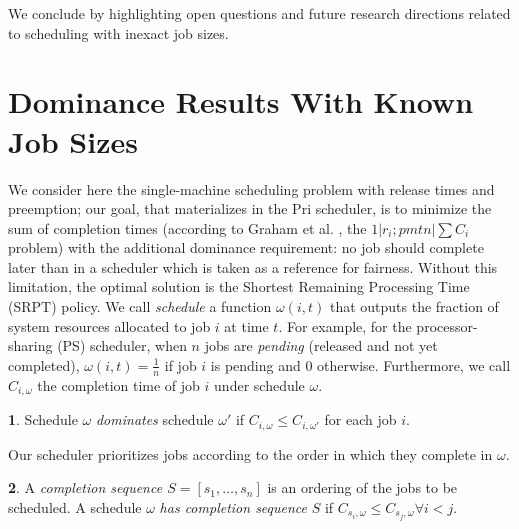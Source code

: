 \documentclass[11pt,oneside,english]{amsart}
\numberwithin{equation}{section}
\numberwithin{figure}{section}
\theoremstyle{definition}
\newtheorem{defn}{\protect\definitionname}
\theoremstyle{plain}
\providecommand{\definitionname}{Definition}
\begin{document}
We conclude by highlighting open questions and future research directions 
related to scheduling with inexact job sizes.



\section{\label{sec:Analytical-Results}Dominance Results With Known Job Sizes}

We consider here the single-machine scheduling problem with release
times and preemption; our goal, that materializes in the $\mathrm{Pri
}$ scheduler, is to minimize the sum of 
completion times (according to Graham et al. \cite{
Graham1979}, the $1|r_{i};pmtn|\sum C_{i}$ problem) with the 
additional dominance requirement: no job should complete later than 
in a scheduler which is taken as a reference for fairness. Without 
this limitation, the optimal solution is the Shortest Remaining 
Processing Time (SRPT) policy. We call \emph{
schedule }a function $\omega\left(i,t\right)$
that outputs the fraction of system resources allocated to job $i$
at time $t$. For example, for the processor-sharing (PS) scheduler,
when $n$ jobs are \emph{pending }(released and not yet completed),
$\omega\left(i,t\right)=\frac{1}{n}$ if job $i$ is pending and $0$
otherwise. Furthermore, we call $C_{i,\omega}$ the completion time
of job $i$ under schedule $\omega$.
\begin{defn}
Schedule $\omega$ \emph{dominates} schedule $\omega'$ if $C_{i,\omega}\leq C_{i,\omega'}$
for each job $i$.
\end{defn}
Our scheduler prioritizes jobs according to the order in which they
complete in $\omega$.
\begin{defn}
A \emph{completion sequence $S=\left[s_{1},\ldots,s_{n}\right]$ }is
an ordering of the jobs to be scheduled. A schedule $\omega$ \emph{has
completion sequence} $S$ if $C_{s_{i},\omega}\leq C_{s_{j},\omega}\forall i<j$.
\end{defn}
\end{document}
